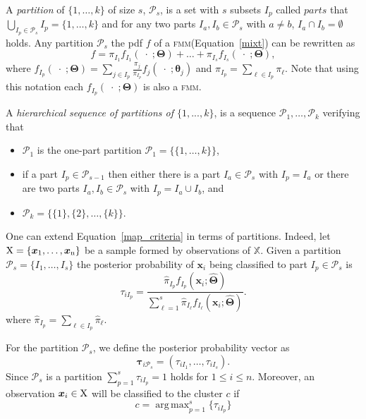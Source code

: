 \documentclass[10pt, a4paper]{article}
\DeclareMathOperator*{\argmax}{arg\,max}
\newcommand{\m}[1]{\boldsymbol{#1}}
\newcommand{\fmm}{\textsc{fmm}\xspace}
\begin{document}
\begin{spacing}{1.9}
%
A \emph{partition} of $\{1, \dots, k\}$ of size $s$, $\mathcal{P}_s$,  is a set with $s$ subsets $I_p$ called $parts$ that $\bigcup_{I_p \in \mathcal{P}_s} I_p = \{1, \dots, k\}$ and for any two parts $I_a, I_b \in \mathcal{P}_s$ with $a \neq b$, $I_a \cap I_b = \emptyset$ holds. Any partition  $\mathcal{P}_s$ the pdf $f$ of a \fmm (Equation~\ref{mixt}) can be rewritten as
\begin{equation}
f = \pi_{I_1} f_{I_1}(\;\cdot\;; \m\Theta) + \dots + \pi_{I_s} f_{I_s}(\;\cdot\;; \m\Theta),
\label{mixt_part}
\end{equation}
where $f_{I_p}(\;\cdot\;;  \m\Theta) = \sum_{j \in I_p} \frac{\pi_j}{\pi_{I_p}} f_j(\;\cdot\; ; \m\theta_j)$ and $\pi_{I_p} = \sum_{\ell \in I_p} \pi_\ell$. Note that using this notation each $f_{I_p}(\;\cdot\;;  \m\Theta)$ is also a \fmm.



A \emph{hierarchical sequence of partitions of $\{1,...,k\}$}, is a sequence $\mathcal{P}_1, \dots, \mathcal{P}_k$ verifying that
\begin{itemize}
\item $\mathcal{P}_1$ is the one-part partition $\mathcal{P}_1 = \{ \{1, \dots, k\} \}$,
\item if a part $I_p \in \mathcal{P}_{s-1}$ then either there is a part $I_a \in \mathcal{P}_{s}$ with $I_p = I_a$ or there are two parts $I_a, I_b \in \mathcal{P}_s$ with $I_p = I_a \cup I_b$, and
\item $\mathcal{P}_k= \{ \{1\},\{2\}, \dots, \{k\} \}$.
\end{itemize}



One can extend Equation~\ref{map_criteria} in terms of partitions. Indeed, let $\rm X = \{\m x_1,\dots, \m x_n\}$ be a sample formed by observations of $\mathbb{X}$. Given a partition $\mathcal{P}_s = \{ I_1, \dots, I_s \}$ the posterior probability of $\m x_i$ being classified to part $I_p\in \mathcal{P}_{s}$ is
\[
\tau_{i I_p} =  \frac{ \hat{\pi}_{I_p} f_{I_p}(\m x_i; \hat{\m\Theta}) }{\sum_{\ell=1}^s \hat{\pi}_{I_\ell} f_{I_\ell}(\m x_i; \hat{\m\Theta})}.
\]
where $\hat{\pi}_{I_p} = \sum_{\ell \in I_p} \hat{\pi}_\ell$.

For the partition  $\mathcal{P}_s$, we define the posterior probability vector as
\begin{equation}\label{ppv}
\m\tau_{i \mathcal{P}_s} = \left(\tau_{i I_1} , \dots, \tau_{i I_s}  \right).
\end{equation}
Since $\mathcal{P}_s$ is a partition $\sum_{p=1}^s \tau_{i I_p} = 1$ holds  for $1 \leq i \leq n$.
Moreover, an observation $\m x_i \in \rm X$ will be classified to the cluster $c$ if
\begin{equation}\label{cluster_criteria}
c= \argmax_{p=1}^s \{ \tau_{i I_p} \}
\end{equation}


\end{spacing}
\end{document}
